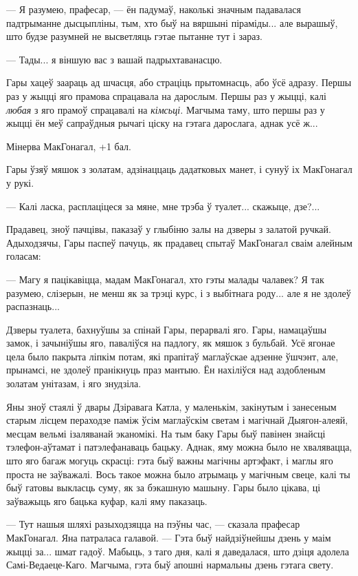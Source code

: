 --- Я разумею, прафесар, --- ён падумаў, наколькі значным падавалася 
падтрыманне дысцыпліны, тым, хто быў на вяршыні піраміды... але вырашыў,
што будзе разумней не высветляць гэтае пытанне тут і зараз.

--- Тады... я віншую вас з вашай падрыхтаванасцю.

Гары хацеў заараць ад шчасця, або страціць прытомнасць, або ўсё адразу. Першы
раз у жыцці яго прамова спрацавала на дарослым. Першы раз у жыцці, калі \emph{любая}
з яго прамоў спрацавалі на \emph{кімсьці.} Магчыма таму, што першы раз у жыцці
ён меў сапраўдныя рычагі ціску на гэтага дарослага, аднак усё ж...

Мінерва МакГонагал, +1 бал.

Гары ўзяў мяшок з золатам, адзінаццаць дадатковых манет, і сунуў іх МакГонагал
у рукі. 

--- Калі ласка, расплаціцеся за мяне, мне трэба ў туалет... скажыце, дзе?...

Прадавец, зноў пачцівы, паказаў  у глыбіню залы на дзверы з залатой ручкай. Адыходзячы,
Гары паспеў пачуць, як прадавец спытаў МакГонагал сваім алейным голасам:

--- Магу я пацікавіцца, мадам МакГонагал, хто гэты малады чалавек? Я так разумею,
слізерын, не менш як за трэці курс, і з выбітнага роду... але я не здолеў 
распазнаць...

Дзверы туалета, бахнуўшы за спінай Гары, перарвалі яго. Гары, намацаўшы замок,
і зачыніўшы яго, паваліўся на падлогу, як мяшок з бульбай. Усё ягонае цела 
было пакрыта ліпкім потам, які прапітаў маглаўскае адзенне ўшчэнт, але, прынамсі,
не здолеў пранікнуць праз мантыю. Ён нахіліўся над аздобленым золатам унітазам,
і яго знудзіла.

\later

Яны зноў стаялі ў двары Дзіравага Катла, у маленькім, закінутым і занесеным старым
лісцем пераходзе паміж ўсім маглаўскім светам і магічнай Дыягон-алеяй,
месцам вельмі
ізаляванай эканомікі. На тым баку Гары быў павінен знайсці тэлефон-аўтамат
і патэлефанаваць бацьку. Аднак, яму можна было не хвалявацца, што яго багаж
могуць скрасці: гэта быў важны магічны артэфакт, і маглы яго проста не 
заўважалі. Вось такое можна было атрымаць у магічным свеце, калі ты быў 
гатовы выкласць суму, як за бэкашную машыну. Гары было цікава, ці заўважыць 
яго бацька куфар, калі яму паказаць. 

--- Тут нашыя шляхі разыходзяцца на пэўны час, --- сказала прафесар МакГонагал. 
Яна патраласа галавой. --- Гэта быў найдзіўнейшы дзень у маім жыцці за... шмат 
гадоў. Мабыць, з таго дня, калі я даведалася, што дзіця адолела Самі-Ведаеце-Каго.
Магчыма, гэта быў апошні нармальны дзень гэтага свету.

